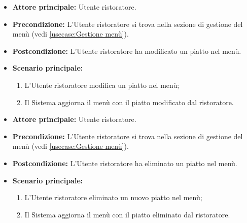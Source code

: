\label{usecase:Modifica piatto}
\begin{itemize}

	\item \textbf{Attore principale:} Utente ristoratore.

	\item \textbf{Precondizione:} L'Utente ristoratore si trova nella sezione di gestione del menù (vedi \autoref{usecase:Gestione menù}).

	\item \textbf{Postcondizione:} L'Utente ristoratore ha modificato un piatto nel menù.

	\item \textbf{Scenario principale:}
	\begin{enumerate}
		\item L'Utente ristoratore modifica un piatto nel menù;
		\item Il Sistema aggiorna il menù con il piatto modificato dal ristoratore.
	\end{enumerate}

\end{itemize}


\label{usecase:Eliminazione piatto}
\begin{itemize}

	\item \textbf{Attore principale:} Utente ristoratore.

	\item \textbf{Precondizione:} L'Utente ristoratore si trova nella sezione di gestione del menù (vedi \autoref{usecase:Gestione menù}).

	\item \textbf{Postcondizione:} L'Utente ristoratore ha eliminato un piatto nel menù.

	\item \textbf{Scenario principale:}
	\begin{enumerate}
		\item L'Utente ristoratore eliminato un nuovo piatto nel menù;
		\item Il Sistema aggiorna il menù con il piatto eliminato dal ristoratore.
	\end{enumerate}

\end{itemize}
